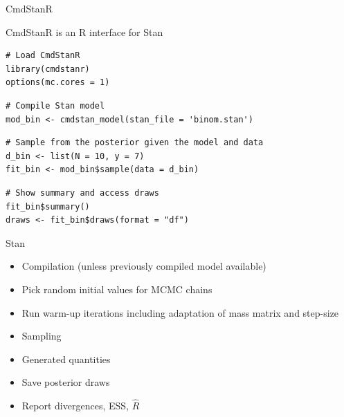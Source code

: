 \documentclass[finnish,english,t]{beamer}
\begin{document}
\begin{frame}[fragile]{CmdStanR}
  
  CmdStanR is an R interface for Stan
  
  {\small
    {
\begin{verbatim}
# Load CmdStanR
library(cmdstanr) 
options(mc.cores = 1)
\end{verbatim}
    }
{
\begin{verbatim}
# Compile Stan model
mod_bin <- cmdstan_model(stan_file = 'binom.stan')
\end{verbatim}
}
{
\begin{verbatim}
# Sample from the posterior given the model and data
d_bin <- list(N = 10, y = 7)
fit_bin <- mod_bin$sample(data = d_bin)
\end{verbatim}
}
{
\begin{verbatim}
# Show summary and access draws
fit_bin$summary()
draws <- fit_bin$draws(format = "df")
\end{verbatim}
}
}
\end{frame}



\begin{frame}{Stan}
  
  \begin{itemize}
  \item Compilation (unless previously compiled model available)
  \item Pick random initial values for MCMC chains
  \item Run warm-up iterations including adaptation of mass matrix and step-size
  \item Sampling
  \item Generated quantities
  \item Save posterior draws
  \item Report divergences, ESS, $\widehat{R}$
  \end{itemize}

\end{frame}
\end{document}
